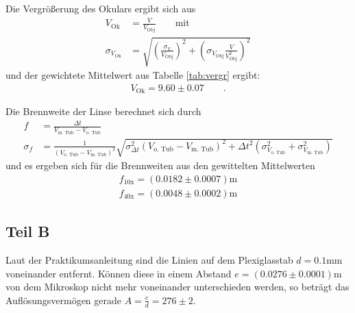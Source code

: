 \documentclass[12pt,a4paper,titlepage,headinclude,bibtotoc]{scrartcl}
\begin{document}
Die Vergrößerung des Okulars ergibt sich aus
\begin{align}
V_\text{Ok}&=\frac{V}{V_\text{Obj}}\qquad \text{mit}\\
\sigma_{V_\text{Ok}}&=\sqrt{\left(\frac{\sigma_V}{V_\text{Obj}}\right)^2+\left(\sigma_{V_\text{Obj}} \frac{V}{V_\text{Obj}^2} \right)^2}
\end{align}
und der gewichtete Mittelwert aus Tabelle \ref{tab:vergr} ergibt:
\begin{align}
V_\text{Ok}=9.60\pm0.07\qquad .
\end{align}

%
%
%
%

Die Brennweite der Linse berechnet sich durch
\begin{align}
f&=\frac{\Delta t}{V_\text{m. Tub} - V_\text{o. Tub}}\\
\sigma_f&=\frac{1}{\left(V_\text{o. Tub} - V_\text{m. Tub}\right)^{2}} \sqrt{\sigma_{\Delta t}^{2} \left(V_\text{o. Tub} - V_\text{m. Tub}\right)^{2} + \Delta t^{2} \left(\sigma_{V_\text{o. Tub}}^{2} + \sigma_{V_\text{m. Tub}}^{2}\right)}
\end{align}
und es ergeben sich für die Brennweiten aus den gewittelten Mittelwerten
\begin{align}
f_\text{10x}=(0.0182 \pm 0.0007)\si\metre\\
f_\text{40x}=(0.0048 \pm 0.0002)\si\metre
\end{align}

\subsection{Teil B}
Laut der Praktikumsanleitung sind die Linien auf dem Plexiglasstab $d=0.1\si{\milli\metre}$ voneinander entfernt.
Können diese in einem Abstand $e=(0.0276\pm0.0001)\si{\metre}$ von dem Mikroskop nicht mehr voneinander unterschieden werden, so beträgt das Auflösungsvermögen gerade $A=\frac{e}{d}=276\pm2$.
\end{document}
